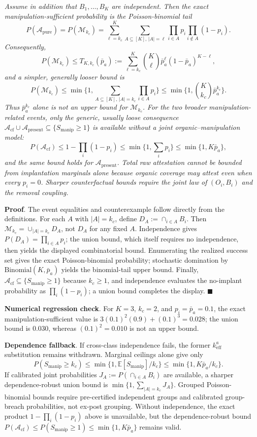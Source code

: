 \documentclass[
  11pt]{article}
\begin{document}
\emph{Assume in addition that \(B_1,\ldots,B_K\) are independent. Then
the exact manipulation-sufficient probability is the Poisson-binomial
tail}
\[P(\mathcal A_{\mathrm{pure}})=P(\mathcal M_{k_c})=\sum_{\ell=k_c}^{K}\sum_{A\subseteq[K],\,|A|=\ell}\prod_{i\in A}p_i\prod_{i\notin A}(1-p_i).\]
\emph{Consequently,}
\[P(\mathcal M_{k_c})\le T_{K,k_c}(\bar p_a):=\sum_{\ell=k_c}^{K}\binom{K}{\ell}\bar p_a^\ell(1-\bar p_a)^{K-\ell},\]
\emph{and a simpler, generally looser bound is}
\[P(\mathcal M_{k_c})\le \min\Big\{1,\sum_{A\subseteq[K],\,|A|=k_c}\prod_{i\in A}p_i\Big\}\le \min\Big\{1,\binom{K}{k_c}\bar p_a^{k_c}\Big\}.\]
\emph{Thus \(\bar p_a^{k_c}\) alone is not an upper bound for
\(\mathcal M_{k_c}\). For the two broader manipulation-related events,
only the generic, usually loose consequence
\(\mathcal A_{\mathrm{cf}}\cup\mathcal A_{\mathrm{present}}\subseteq\{S_{\mathrm{manip}}\ge1\}\)
is available without a joint organic--manipulation model:}
\[P(\mathcal A_{\mathrm{cf}})\le1-\prod_i(1-p_i)\le\min\{1,\sum_ip_i\}\le\min\{1,K\bar p_a\},\]
\emph{and the same bound holds for \(\mathcal A_{\mathrm{present}}\).
Total raw attestation cannot be bounded from implantation marginals
alone because organic coverage may attest even when every \(p_i=0\).
Sharper counterfactual bounds require the joint law of \((O_i,B_i)\) and
the removal coupling.}

\textbf{Proof}. The event equalities and counterexample follow directly
from the definitions. For each \(A\) with \(|A|=k_c\), define
\(D_A:=\cap_{i\in A}B_i\). Then \(\mathcal M_{k_c}=\cup_{|A|=k_c}D_A\),
not \(D_A\) for any fixed \(A\). Independence gives
\(P(D_A)=\prod_{i\in A}p_i\); the union bound, which itself requires no
independence, then yields the displayed combinatorial bound. Enumerating
the realized success set gives the exact Poisson-binomial probability;
stochastic domination by \(\mathrm{Binomial}(K,\bar p_a)\) yields the
binomial-tail upper bound. Finally,
\(\mathcal A_{\mathrm{cf}}\subseteq\{S_{\mathrm{manip}}\ge1\}\) because
\(k_c\ge1\), and independence evaluates the no-implant probability as
\(\prod_i(1-p_i)\); a union bound completes the display.
\(\blacksquare\)

\textbf{Numerical regression check}. For \(K=3\), \(k_c=2\), and
\(p_i=\bar p_a=0.1\), the exact manipulation-sufficient value is
\(3(0.1)^2(0.9)+(0.1)^3=0.028\); the union bound is \(0.030\), whereas
\((0.1)^2=0.010\) is not an upper bound.

\textbf{Dependence fallback}. If cross-class independence fails, the
former \(k_{\mathrm{eff}}^a\) substitution remains withdrawn. Marginal
ceilings alone give only
\[P(S_{\mathrm{manip}}\ge k_c)\le\min\{1,\mathbb E[S_{\mathrm{manip}}]/k_c\}\le\min\{1,K\bar p_a/k_c\}.\]
If calibrated joint probabilities \(J_A:=P(\cap_{i\in A}B_i)\) are
available, a sharper dependence-robust union bound is
\(\min\{1,\sum_{|A|=k_c}J_A\}\). Grouped Poisson-binomial bounds require
pre-certified independent groups and calibrated group-breach
probabilities, not ex-post grouping. Without independence, the exact
product \(1-\prod_i(1-p_i)\) above is unavailable, but the
dependence-robust bound
\(P(\mathcal A_{\mathrm{cf}})\le P(S_{\mathrm{manip}}\ge1)\le\min\{1,K\bar p_a\}\)
remains valid.
\end{document}
